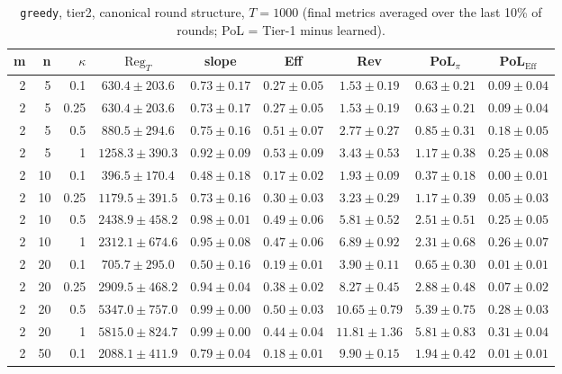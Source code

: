 \begin{table}[htbp]
\centering
\scriptsize
\caption{\texttt{greedy}, tier2, canonical round structure, $T=1000$ (final metrics averaged over the last 10\% of rounds; PoL = Tier-1 minus learned).}
\label{tab:tier2_greedy_canonical}
\begin{tabular}{@{}rrrcccccc@{}}
\toprule
m & n & $\kappa$ & $\mathrm{Reg}_T$ & slope & Eff & Rev & PoL$_\pi$ & PoL$_\mathrm{Eff}$ \\
\midrule
2 & 5 & 0.1 & $630.4 \pm 203.6$ & $0.73 \pm 0.17$ & $0.27 \pm 0.05$ & $1.53 \pm 0.19$ & $0.63 \pm 0.21$ & $0.09 \pm 0.04$ \\
2 & 5 & 0.25 & $630.4 \pm 203.6$ & $0.73 \pm 0.17$ & $0.27 \pm 0.05$ & $1.53 \pm 0.19$ & $0.63 \pm 0.21$ & $0.09 \pm 0.04$ \\
2 & 5 & 0.5 & $880.5 \pm 294.6$ & $0.75 \pm 0.16$ & $0.51 \pm 0.07$ & $2.77 \pm 0.27$ & $0.85 \pm 0.31$ & $0.18 \pm 0.05$ \\
2 & 5 & 1 & $1258.3 \pm 390.3$ & $0.92 \pm 0.09$ & $0.53 \pm 0.09$ & $3.43 \pm 0.53$ & $1.17 \pm 0.38$ & $0.25 \pm 0.08$ \\
2 & 10 & 0.1 & $396.5 \pm 170.4$ & $0.48 \pm 0.18$ & $0.17 \pm 0.02$ & $1.93 \pm 0.09$ & $0.37 \pm 0.18$ & $0.00 \pm 0.01$ \\
2 & 10 & 0.25 & $1179.5 \pm 391.5$ & $0.73 \pm 0.16$ & $0.30 \pm 0.03$ & $3.23 \pm 0.29$ & $1.17 \pm 0.39$ & $0.05 \pm 0.03$ \\
2 & 10 & 0.5 & $2438.9 \pm 458.2$ & $0.98 \pm 0.01$ & $0.49 \pm 0.06$ & $5.81 \pm 0.52$ & $2.51 \pm 0.51$ & $0.25 \pm 0.05$ \\
2 & 10 & 1 & $2312.1 \pm 674.6$ & $0.95 \pm 0.08$ & $0.47 \pm 0.06$ & $6.89 \pm 0.92$ & $2.31 \pm 0.68$ & $0.26 \pm 0.07$ \\
2 & 20 & 0.1 & $705.7 \pm 295.0$ & $0.50 \pm 0.16$ & $0.19 \pm 0.01$ & $3.90 \pm 0.11$ & $0.65 \pm 0.30$ & $0.01 \pm 0.01$ \\
2 & 20 & 0.25 & $2909.5 \pm 468.2$ & $0.94 \pm 0.04$ & $0.38 \pm 0.02$ & $8.27 \pm 0.45$ & $2.88 \pm 0.48$ & $0.07 \pm 0.02$ \\
2 & 20 & 0.5 & $5347.0 \pm 757.0$ & $0.99 \pm 0.00$ & $0.50 \pm 0.03$ & $10.65 \pm 0.79$ & $5.39 \pm 0.75$ & $0.28 \pm 0.03$ \\
2 & 20 & 1 & $5815.0 \pm 824.7$ & $0.99 \pm 0.00$ & $0.44 \pm 0.04$ & $11.81 \pm 1.36$ & $5.81 \pm 0.83$ & $0.31 \pm 0.04$ \\
2 & 50 & 0.1 & $2088.1 \pm 411.9$ & $0.79 \pm 0.04$ & $0.18 \pm 0.01$ & $9.90 \pm 0.15$ & $1.94 \pm 0.42$ & $0.01 \pm 0.01$ \\

\end{tabular}
\end{table}
